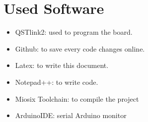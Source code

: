 \documentclass[18pt,oneside,a4paper, titlepage]{article}
\begin{document}
\section{Used Software}
\begin{itemize}
	\item QSTlink2: used to program the board.
	\item Github: to save every code changes  online.
	\item Latex: to write this document.
	\item Notepad++: to write code.
	\item Miosix Toolchain: to compile the project
	\item ArduinoIDE: serial Arduino monitor 

\end{itemize}
\end{document}

